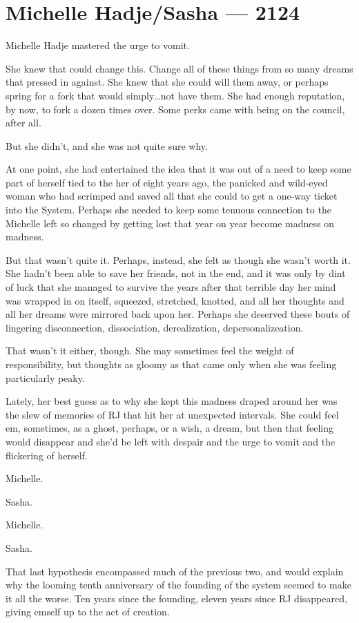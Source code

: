 \hypertarget{michelle-hadjesasha-2124}{%
\chapter{Michelle Hadje/Sasha — 2124}\label{michelle-hadjesasha-2124}}

Michelle Hadje mastered the urge to vomit.

She knew that could change this. Change all of these things from so many dreams that pressed in against. She knew that she could will them away, or perhaps spring for a fork that would simply\ldots not have them. She had enough reputation, by now, to fork a dozen times over. Some perks came with being on the council, after all.

But she didn't, and she was not quite sure why.

At one point, she had entertained the idea that it was out of a need to keep some part of herself tied to the her of eight years ago, the panicked and wild-eyed woman who had scrimped and saved all that she could to get a one-way ticket into the System. Perhaps she needed to keep some tenuous connection to the Michelle left so changed by getting lost that year on year become madness on madness.

But that wasn't quite it. Perhaps, instead, she felt as though she wasn't worth it. She hadn't been able to save her friends, not in the end, and it was only by dint of luck that she managed to survive the years after that terrible day her mind was wrapped in on itself, squeezed, stretched, knotted, and all her thoughts and all her dreams were mirrored back upon her. Perhaps she deserved these bouts of lingering disconnection, dissociation, derealization, depersonalizeation.

That wasn't it either, though. She may sometimes feel the weight of responsibility, but thoughts as gloomy as that came only when she was feeling particularly peaky.

Lately, her best guess as to why she kept this madness draped around her was the slew of memories of RJ that hit her at unexpected intervals. She could feel em, sometimes, as a ghost, perhaps, or a wish, a dream, but then that feeling would disappear and she'd be left with despair and the urge to vomit and the flickering of herself.

Michelle.

Sasha.

Michelle.

Sasha.

That last hypothesis encompassed much of the previous two, and would explain why the looming tenth anniversary of the founding of the system seemed to make it all the worse. Ten years since the founding, eleven years since RJ disappeared, giving emself up to the act of creation.

